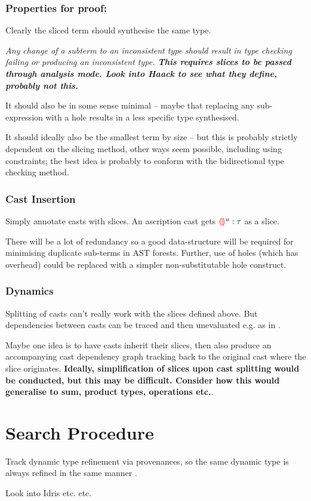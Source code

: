 \subsubsection{Properties for proof:} 
Clearly the sliced term should synthesise the same type.\par 
\textit{Any change of a subterm to an inconsistent type should result in type checking failing or producing an inconsistent type. \textbf{This requires slices to be passed through analysis mode. Look into Haack to see what they define, probably not this.}}\par
It should also be in some sense minimal -- maybe that replacing any sub-expression with a hole results in a less specific type synthesised.\par 
It should ideally also be the smallest term by size -- but this is probably strictly dependent on the slicing method, other ways seem possible, including using constraints; the best idea is probably to conform with the bidirectional type checking method.

\subsubsection{Cast Insertion}
Simply annotate casts with slices. An ascription cast gets ${\color{red}\llparenthesis}  {\color{red}\rrparenthesis}^u : \tau$ as a slice.
\par 
There will be a lot of redundancy so a good data-structure will be required for minimising duplicate sub-terms in AST forests. Further, use of holes (which has overhead) could be replaced with a simpler non-substitutable hole construct.

\subsubsection{Dynamics}
Splitting of casts can't really work with the slices defined above. But dependencies between casts can be traced and then unevaluated e.g. as in \cite{FuctionalProgExplain}.\par
Maybe one idea is to have casts inherit their slices, then also produce an accompanying cast dependency graph tracking back to the original cast where the slice originates. \textbf{Ideally, simplification of slices upon cast splitting would be conducted, but this may be difficult. Consider how this would generalise to sum, product types, operations etc.}.


\section{Search Procedure}
Track dynamic type refinement via provenances, so the same dynamic type is always refined in the same manner \cite{MarkedLocalisation}.\par 
Look into Idris etc. etc.

